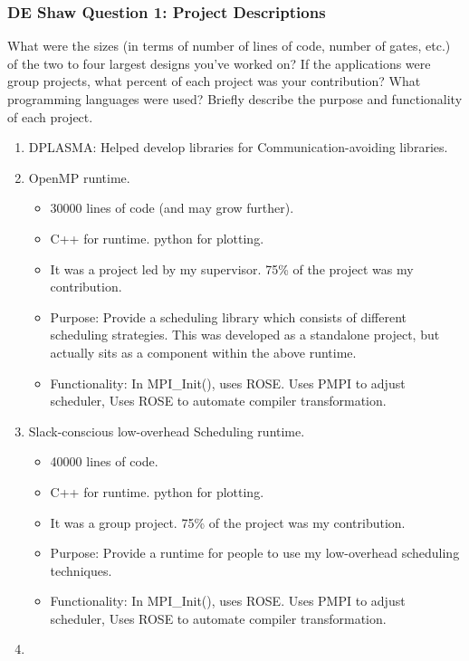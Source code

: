 \begin{frame}  
\frametitle{ DE Shaw Question 1: Project Descriptions }  
{\tiny What were the sizes (in terms of number of lines of code, number of
gates, etc.) of the two to four largest designs you've worked on? If
the applications were group projects, what percent of each project was
your contribution? What programming languages were used? Briefly
describe the purpose and functionality of each project.} 

\begin{enumerate} 
\item \tiny DPLASMA: Helped develop libraries for Communication-avoiding libraries. 

\item \tiny OpenMP runtime. 
\begin{itemize} 
\tiny \item \tiny 30000 lines of code (and may grow further). 
\item \tiny C++ for runtime. python for plotting. 
\item \tiny It was a project led by my supervisor. 75\% of the project
  was my contribution. 

\item \tiny Purpose: Provide a scheduling library which consists of
  different scheduling strategies. This was developed as a standalone project,
  but actually sits as a component within the above runtime. 

\item \tiny Functionality: In MPI\_Init(), uses ROSE.  
Uses PMPI to adjust scheduler, Uses ROSE to automate compiler
transformation. %
\end{itemize} 

\item \tiny Slack-conscious low-overhead Scheduling runtime. 

\begin{itemize} 
\tiny \item \tiny 40000 lines of code. 
\item \tiny C++ for runtime. python for plotting. 
\item \tiny It was a group project. 75\% of the project was my
  contribution. 
\item \tiny Purpose: Provide a runtime for people to use my
  low-overhead scheduling techniques.  
\item \tiny Functionality: In MPI\_Init(), uses ROSE.  
Uses PMPI to adjust scheduler, Uses ROSE to automate compiler
transformation. %
\end{itemize} 

\item \tiny 
\end{enumerate} 




\end{frame} 

